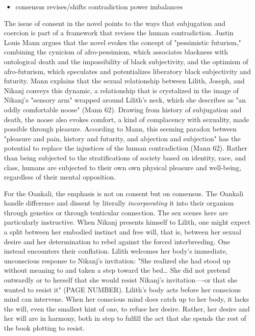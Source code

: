 \documentclass[11pt]{article}
\begin{document}
\begin{itemize}
\item consensus revises/shifts contradiction power imbalances
\end{itemize}
The issue of consent in the novel points to the ways that subjugation
and coercion is part of a framework that revises the human
contradiction. Justin Louis Mann argues that the novel evokes the
concept of "pessimistic futurism," combining the cynicism of
afro-pessimism, which associates blackness with ontological death and
the impossibility of black subjectivity, and the optimism of
afro-futurism, which speculates and potentializes liberatory black
subjectivity and futurity. Mann explains that the sexual relationship
between Lilith, Joseph, and Nikanj conveys this dynamic, a
relationship that is crystalized in the image of Nikanj's "sensory
arm" wrapped around Lilith's neck, which she describes as "an oddly
comfortable noose" (Mann 62). Drawing from history of subjugation and
death, the noose also evokes comfort, a kind of complacency with
sexuality, made possible through pleasure. According to Mann, this
seeming paradox between "pleasure and pain, history and futurity, and
abjection and subjection" has the potential to replace the injustices
of the human contradiction (Mann 62). Rather than being subjected to
the stratifications of society based on identity, race, and class,
humans are subjected to their own own physical pleasure and
well-being, regardless of their mental opposition.

For the Oankali, the emphasis is not on consent but on consensus. The
Oankali handle difference and dissent by literally \emph{incorporating} it
into their organism through genetics or through tenticular
connection. The sex scenes here are particularly instructive. When
Nikanj presents himself to Lilith, one might expect a split between
her embodied instinct and free will, that is, between her sexual
desire and her determination to rebel against the forced
interbreeding. One instead encounters their conflation. Lilith
welcomes her body's immediate, unconscious response to Nikanj's
invitation: "She realized she had stood up without meaning to and
taken a step toward the bed\ldots{} She did not pretend outwardly or to
herself that she would resist Nikanj’s invitation—-or that she wanted
to resist it" (PAGE NUMBER). Lilith's body acts before her conscious
mind can intervene. When her conscious mind does catch up to her body,
it lacks the will, even the smallest hint of one, to refuse her
desire. Rather, her desire and her will are in harmony, both in step
to fulfill the act that she spends the rest of the book plotting to
resist.
\end{document}

